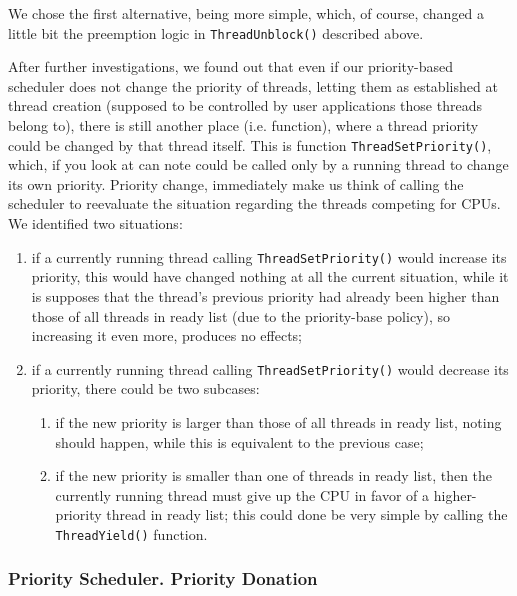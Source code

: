 We chose the first alternative, being more simple, which, of course, changed a little bit the preemption logic in \lstinline|ThreadUnblock()| described above.

After further investigations, we found out that even if our priority-based scheduler does not change the priority of threads, letting them as established at thread creation (supposed to be controlled by user applications those threads belong to), there is still another place (i.e. function), where a thread priority could be changed by that thread itself. This is function \lstinline|ThreadSetPriority()|, which, if you look at can note could be called only by a running thread to change its own priority. Priority change, immediately make us think of calling the scheduler to reevaluate the situation regarding the threads competing for CPUs. We identified two situations:
\begin{enumerate}
    \item if a currently running thread calling \lstinline|ThreadSetPriority()| would increase its priority, this would have changed nothing at all the current situation, while it is supposes that the thread's previous priority had already been higher than those of all threads in ready list (due to the priority-base policy), so increasing it even more, produces no effects;
    
    \item if a currently running thread calling \lstinline|ThreadSetPriority()| would decrease its priority, there could be two subcases:
        \begin{enumerate}
            \item if the new priority is larger than those of all threads in ready list, noting should happen, while this is equivalent to the previous case;
            
            \item if the new priority is smaller than one of threads in ready list, then the currently running thread must give up the CPU in favor of a higher-priority thread in ready list; this could done be very simple by calling the \lstinline|ThreadYield()| function.
        \end{enumerate}

\end{enumerate}


\subsubsection{Priority Scheduler. Priority Donation}
\label{subsubsec:prio-donation-analysis-and-design}

